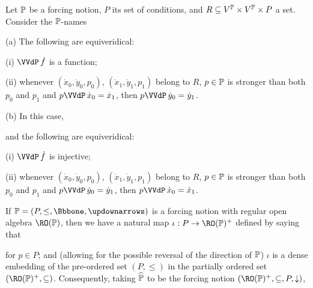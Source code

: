  Let $\Bbb P$ be a forcing notion,
$P$ its set of conditions, and
$R\subseteq V^{\Bbb P}\times V^{\Bbb P}\times P$ a set.
Consider the $\Bbb P$-names



(a) The following are equiveridical:

\quad(i) $\VVdP\,\dot f$ is a function;

\quad(ii) whenever $(\dot x_0,\dot y_0,p_0)$,
$(\dot x_1,\dot y_1,p_1)$ belong to $R$,
$p\in\Bbb P$ is stronger than both $p_0$ and $p_1$
and $p\VVdP\,\dot x_0=\dot x_1$, then $p\VVdP\,\dot y_0=\dot y_1$.

(b) In this case,


\noindent and the following are equiveridical:

\quad(i) $\VVdP\,\dot f$ is injective;

\quad(ii) whenever $(\dot x_0,\dot y_0,p_0)$,
$(\dot x_1,\dot y_1,p_1)$ belong to $R$,
$p\in\Bbb P$ is stronger than both $p_0$ and $p_1$
and $p\VVdP\,\dot y_0=\dot y_1$, then $p\VVdP\,\dot x_0=\dot x_1$.




 If
$\Bbb P=(P,\le,\Bbbone,\updownarrows)$ is a forcing notion with regular
open algebra $\RO(\Bbb P)$, then we have a natural map
$\iota:P\to\RO(\Bbb P)^+$ defined by saying that


\noindent for $p\in P$;
and (allowing for the possible reversal of the direction of $\Bbb P$)
$\iota$ is a dense
embedding of the pre-ordered set $(P,\le)$ in the partially ordered set
$(\RO(\Bbb P)^+,\subseteq)$.
Consequently, taking $\widehat{\Bbb P}$ to be the forcing notion
$(\RO(\Bbb P)^+,\subseteq,P,\downarrow)$,


